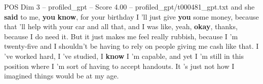 \begin{textsample}{POS Dim 3 – profiled\_gpt – Score 4.00 – profiled\_gpt/t000481\_gpt.txt}  \label{ex:f3_pos_029}
and she \textbf{said} to me, \textbf{you} \textbf{know}, for your birthday I ’ll just give \textbf{you} some money, because that ’ll help with your car and all that, and I was like, yeah, \textbf{okay}, thanks, because I do need it.
But it just makes me feel really rubbish, because I ’m twenty‑five and I shouldn't be having to rely on people giving me cash like that.
I ’ve worked hard, I ’ve studied, I \textbf{know} I ’m capable, and yet I ’m still in this position where I ’m sort of having to accept handouts.
It ’s just not how I imagined things would be at my age.

\end{textsample}
